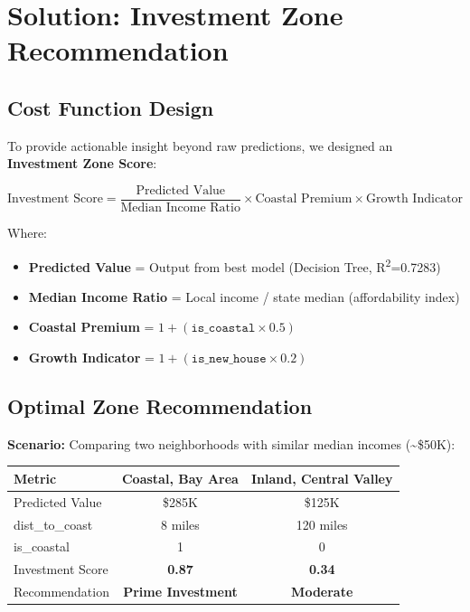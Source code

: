 \documentclass[12pt,a4paper]{article}
\begin{document}
\section{Solution: Investment Zone Recommendation}

\subsection{Cost Function Design}

To provide actionable insight beyond raw predictions, we designed an \textbf{Investment Zone Score}:

\[
\text{Investment Score} = \frac{\text{Predicted Value}}{\text{Median Income Ratio}} \times \text{Coastal Premium} \times \text{Growth Indicator}
\]

Where:
\begin{itemize}
    \item \textbf{Predicted Value} = Output from best model (Decision Tree, R\textsuperscript{2}=0.7283)
    \item \textbf{Median Income Ratio} = Local income / state median (affordability index)
    \item \textbf{Coastal Premium} = $1 + (\texttt{is\_coastal} \times 0.5)$
    \item \textbf{Growth Indicator} = $1 + (\texttt{is\_new\_house} \times 0.2)$
\end{itemize}

\subsection{Optimal Zone Recommendation}

\textbf{Scenario:} Comparing two neighborhoods with similar median incomes (\textasciitilde\$50K):

\begin{table}[H]
\centering
\begin{tabular}{lcc}
\toprule
\textbf{Metric} & \textbf{Coastal, Bay Area} & \textbf{Inland, Central Valley} \\
\midrule
Predicted Value & \$285K & \$125K \\
dist\_to\_coast & 8 miles & 120 miles \\
is\_coastal & 1 & 0 \\
Investment Score & \textbf{0.87} & \textbf{0.34} \\
Recommendation & \textbf{Prime Investment} & \textbf{Moderate} \\
\bottomrule
\end{tabular}
\end{table}
\end{document}
